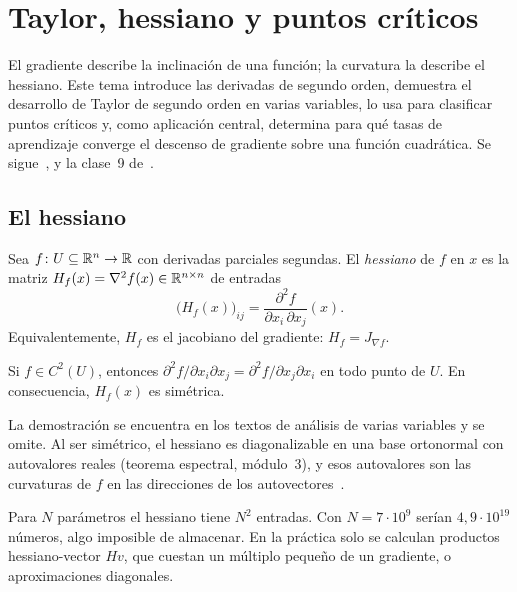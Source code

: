 \chapter{Taylor, hessiano y puntos críticos}
\label{tema:4}

El gradiente describe la inclinación de una función; la curvatura la describe el hessiano. Este tema introduce las derivadas de segundo orden, demuestra el desarrollo de Taylor de segundo orden en varias variables, lo usa para clasificar puntos críticos y, como aplicación central, determina para qué tasas de aprendizaje converge el descenso de gradiente sobre una función cuadrática. Se sigue~\cite[§5.7 y §5.8]{mml}, \cite[§4.2 y §4.3.1]{gbc} y la clase~9 de~\cite{mit1802}.

\section{El hessiano}

\begin{definicion}[Hessiano]\label{def:hessiano}
Sea $f\colon U\subseteq\mathbb{R}^{n}\to\mathbb{R}$ con derivadas parciales segundas. El \emph{hessiano} de $f$ en $x$ es la matriz $H_f(x)=\nabla^{2}f(x)\in\mathbb{R}^{n\times n}$ de entradas
\[
\bigl(H_f(x)\bigr)_{ij}=\frac{\partial^{2}f}{\partial x_i\,\partial x_j}(x).
\]
Equivalentemente, $H_f$ es el jacobiano del gradiente: $H_f=J_{\nabla f}$.
\end{definicion}

\begin{teorema}[Schwarz]\label{teo:schwarz}
Si $f\in C^{2}(U)$, entonces $\partial^{2}f/\partial x_i\partial x_j=\partial^{2}f/\partial x_j\partial x_i$ en todo punto de $U$. En consecuencia, $H_f(x)$ es simétrica.
\end{teorema}

La demostración se encuentra en los textos de análisis de varias variables y se omite. Al ser simétrico, el hessiano es diagonalizable en una base ortonormal con autovalores reales (teorema espectral, módulo~3), y esos autovalores son las curvaturas de $f$ en las direcciones de los autovectores~\cite[§4.3.1]{gbc}.

\addtocounter{definicion}{1}%

\begin{observacion}
Para $N$ parámetros el hessiano tiene $N^{2}$ entradas. Con $N=7\cdot 10^{9}$ serían $4{,}9\cdot 10^{19}$ números, algo imposible de almacenar. En la práctica solo se calculan productos hessiano-vector $H v$, que cuestan un múltiplo pequeño de un gradiente, o aproximaciones diagonales.
\end{observacion}

